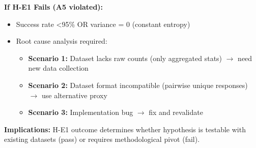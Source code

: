 \textbf{If H-E1 Fails (A5 violated):}
\begin{itemize}
\item Success rate <95\% OR variance = 0 (constant entropy)
\item Root cause analysis required:
  \begin{itemize}
  \item \textbf{Scenario 1:} Dataset lacks raw counts (only aggregated stats) $\rightarrow$ need new data collection
  \item \textbf{Scenario 2:} Dataset format incompatible (pairwise unique responses) $\rightarrow$ use alternative proxy
  \item \textbf{Scenario 3:} Implementation bug $\rightarrow$ fix and revalidate
  \end{itemize}
\end{itemize}

\textbf{Implications:} H-E1 outcome determines whether hypothesis is testable with existing datasets (pass) or requires methodological pivot (fail).
